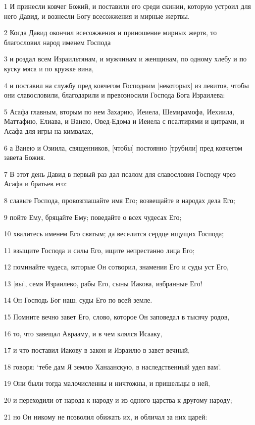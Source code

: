 \par 1 И принесли ковчег Божий, и поставили его среди скинии, которую устроил для него Давид, и вознесли Богу всесожжения и мирные жертвы.
\par 2 Когда Давид окончил всесожжения и приношение мирных жертв, то благословил народ именем Господа
\par 3 и роздал всем Израильтянам, и мужчинам и женщинам, по одному хлебу и по куску мяса и по кружке вина,
\par 4 и поставил на службу пред ковчегом Господним [некоторых] из левитов, чтобы они славословили, благодарили и превозносили Господа Бога Израилева:
\par 5 Асафа главным, вторым по нем Захарию, Иеиела, Шемирамофа, Иехиила, Маттафию, Елиава, и Ванею, Овед-Едома и Иеиела с псалтирями и цитрами, и Асафа для игры на кимвалах,
\par 6 а Ванею и Озиила, священников, [чтобы] постоянно [трубили] пред ковчегом завета Божия.
\par 7 В этот день Давид в первый раз дал псалом для славословия Господу чрез Асафа и братьев его:
\par 8 славьте Господа, провозглашайте имя Его; возвещайте в народах дела Его;
\par 9 пойте Ему, бряцайте Ему; поведайте о всех чудесах Его;
\par 10 хвалитесь именем Его святым; да веселится сердце ищущих Господа;
\par 11 взыщите Господа и силы Его, ищите непрестанно лица Его;
\par 12 поминайте чудеса, которые Он сотворил, знамения Его и суды уст Его,
\par 13 [вы], семя Израилево, рабы Его, сыны Иакова, избранные Его!
\par 14 Он Господь Бог наш; суды Его по всей земле.
\par 15 Помните вечно завет Его, слово, которое Он заповедал в тысячу родов,
\par 16 то, что завещал Аврааму, и в чем клялся Исааку,
\par 17 и что поставил Иакову в закон и Израилю в завет вечный,
\par 18 говоря: `тебе дам Я землю Ханаанскую, в наследственный удел вам'.
\par 19 Они были тогда малочисленны и ничтожны, и пришельцы в ней,
\par 20 и переходили от народа к народу и из одного царства к другому народу;
\par 21 но Он никому не позволил обижать их, и обличал за них царей:
